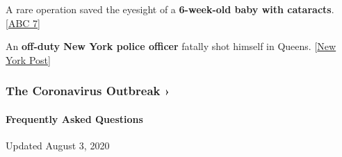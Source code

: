 A rare operation saved the eyesight of a \textbf{6-week-old baby with
cataracts}. {[}\href{https://abc7ny.com/6340873/}{ABC 7}{]}

An \textbf{off-duty New York police officer} fatally shot himself in
Queens.
{[}\href{https://nypost.com/2020/08/02/off-duty-nypd-cop-shoots-himself-in-the-head-in-queens-suicide/}{New
York Post}{]}

\href{https://www.nytimes3xbfgragh.onion/news-event/coronavirus?action=click\&pgtype=Article\&state=default\&region=MAIN_CONTENT_3\&context=storylines_faq}{}

\hypertarget{the-coronavirus-outbreak-}{%
\subsubsection{The Coronavirus Outbreak
›}\label{the-coronavirus-outbreak-}}

\hypertarget{frequently-asked-questions}{%
\paragraph{Frequently Asked
Questions}\label{frequently-asked-questions}}

Updated August 3, 2020

